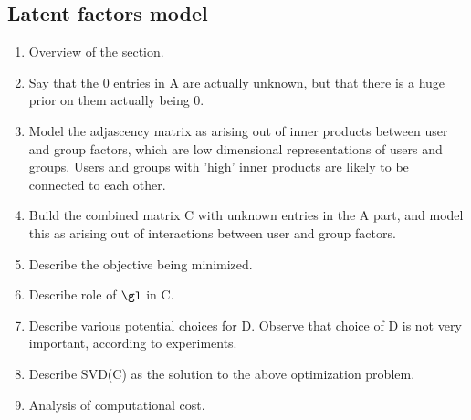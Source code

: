 \documentclass[11pt]{article}
\begin{document}
\subsection{Latent factors model}
\begin{enumerate}
 \item Overview of the section.
 \item Say that the 0 entries in A are actually unknown, but that there is a huge prior on them actually being 0.
 \item Model the adjascency matrix as arising out of inner products between user and group factors, which are low dimensional representations of users and groups. Users and groups with 'high' inner products are likely to be connected to each other.
 \item Build the combined matrix C with unknown entries in the A part, and model this as arising out of interactions between user and group factors.
 \item Describe the objective being minimized.
 \item Describe role of $\gl$ in C.
 \item Describe various potential choices for D. Observe that choice of D is not very important, according to experiments.
 \item Describe SVD(C) as the solution to the above optimization problem.
 \item Analysis of computational cost.
\end{enumerate}
\end{document}
